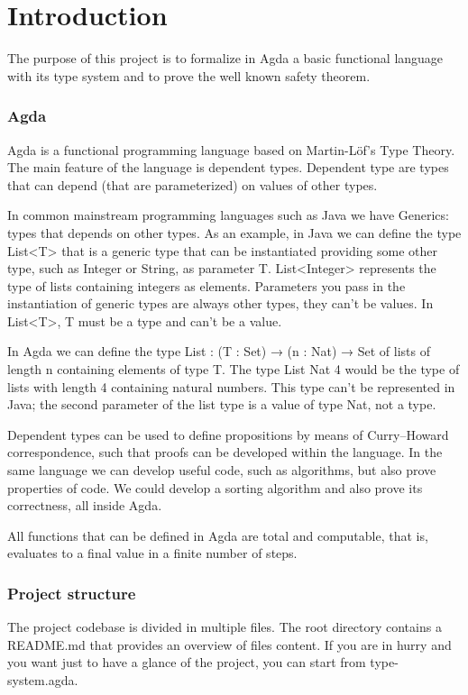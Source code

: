 \documentclass{article}
\begin{document}
\section{Introduction}

The purpose of this project is to formalize in Agda a basic functional language with its type system and to prove the well known safety theorem.


\subsubsection*{Agda}
Agda is a functional programming language based on Martin-Löf's Type Theory.
The main feature of the language is dependent types.
Dependent type are types that can depend (that are parameterized) on values of other types.

In common mainstream programming languages such as Java we have Generics: types that depends on other types.
As an example, in Java we can define the type List<T> that is a generic type that can be instantiated providing some other type, such as Integer or String, as parameter T.
List<Integer> represents the type of lists containing integers as elements.
Parameters you pass in the instantiation of generic types are always other types, they can't be values.
In List<T>, T must be a type and can't be a value.

In Agda we can define the type List : (T : Set) → (n : Nat) → Set of lists of length n containing elements of type T.
The type List Nat 4 would be the type of lists with length 4 containing natural numbers.
This type can't be represented in Java; the second parameter of the list type is a value of type Nat, not a type.

Dependent types can be used to define propositions by means of Curry–Howard correspondence, such that proofs can be developed within the language.
In the same language we can develop useful code, such as algorithms, but also prove properties of code.
We could develop a sorting algorithm and also prove its correctness, all inside Agda.

All functions that can be defined in Agda are total and computable, that is, evaluates to a final value in a finite number of steps.


\subsubsection*{Project structure}

The project codebase is divided in multiple files.
The root directory contains a README.md that provides an overview of files content.
If you are in hurry and you want just to have a glance of the project, you can start from type-system.agda.
\end{document}
